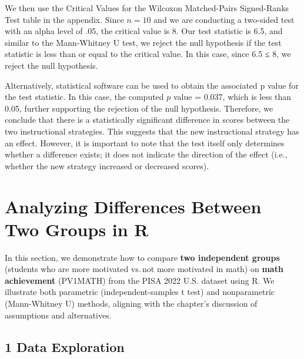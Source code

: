 \documentclass[
  letterpaper,
  DIV=11,
  numbers=noendperiod]{scrreprt}
\newenvironment{Shaded}{\begin{snugshade}}{\end{snugshade}}
\newcommand{\AttributeTok}[1]{\textcolor[rgb]{0.40,0.45,0.13}{#1}}
\newcommand{\DecValTok}[1]{\textcolor[rgb]{0.68,0.00,0.00}{#1}}
\newcommand{\FunctionTok}[1]{\textcolor[rgb]{0.28,0.35,0.67}{#1}}
\newcommand{\NormalTok}[1]{\textcolor[rgb]{0.00,0.23,0.31}{#1}}
\newcommand{\OtherTok}[1]{\textcolor[rgb]{0.00,0.23,0.31}{#1}}
\newcommand{\SpecialCharTok}[1]{\textcolor[rgb]{0.37,0.37,0.37}{#1}}
\newcommand{\StringTok}[1]{\textcolor[rgb]{0.13,0.47,0.30}{#1}}
\begin{document}
We then use the Critical Values for the Wilcoxon Matched-Pairs
Signed-Ranks Test table in the appendix. Since \(n = 10\) and we are
conducting a two-sided test with an alpha level of .05, the critical
value is 8. Our test statistic is 6.5, and similar to the Mann-Whitney U
test, we reject the null hypothesis if the test statistic is less than
or equal to the critical value. In this case, since 6.5 ≤ 8, we reject
the null hypothesis.

Alternatively, statistical software can be used to obtain the associated
p value for the test statistic. In this case, the computed \(p\) value =
0.037, which is less than 0.05, further supporting the rejection of the
null hypothesis. Therefore, we conclude that there is a statistically
significant difference in scores between the two instructional
strategies. This suggests that the new instructional strategy has an
effect. However, it is important to note that the test itself only
determines whether a difference exists; it does not indicate the
direction of the effect (i.e., whether the new strategy increased or
decreased scores).


\chapter*{Analyzing Differences Between Two Groups in
R}\label{analyzing-differences-between-two-groups-in-r}


In this section, we demonstrate how to compare \textbf{two independent
groups} (students who are more motivated vs.\,not more motivated in
math) on \textbf{math achievement} (PV1MATH) from the PISA 2022 U.S.
dataset using R. We illustrate both parametric (independent-samples t
test) and nonparametric (Mann-Whitney U) methods, aligning with the
chapter's discussion of assumptions and alternatives.

\section*{1 Data Exploration}\label{data-exploration-1}


\begin{Shaded}
\end{Shaded}
\end{document}
